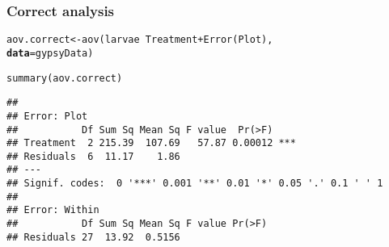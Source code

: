 \documentclass[color=usenames,dvipsnames]{beamer}\usepackage[]{graphicx}\usepackage[]{color}
\makeatletter
\newcommand{\hlopt}[1]{\textcolor[rgb]{0,0,0}{#1}}%
\newcommand{\hlstd}[1]{\textcolor[rgb]{0,0,0}{#1}}%
\newcommand{\hlkwb}[1]{\textcolor[rgb]{0,0.341,0.682}{#1}}%
\newcommand{\hlkwc}[1]{\textcolor[rgb]{0,0,0}{\textbf{#1}}}%
\newcommand{\hlkwd}[1]{\textcolor[rgb]{0.004,0.004,0.506}{#1}}%
\newenvironment{kframe}{%
 \def\at@end@of@kframe{}%
 \ifinner\ifhmode%
  \def\at@end@of@kframe{\end{minipage}}%
  \begin{minipage}{\columnwidth}%
 \fi\fi%
 \def\FrameCommand##1{\hskip\@totalleftmargin \hskip-\fboxsep
 \colorbox{shadecolor}{##1}\hskip-\fboxsep
     \hskip-\linewidth \hskip-\@totalleftmargin \hskip\columnwidth}%
 \MakeFramed {\advance\hsize-\width
   \@totalleftmargin\z@ \linewidth\hsize
   \@setminipage}}%
 {\par\unskip\endMakeFramed%
 \at@end@of@kframe}
\newenvironment{knitrout}{}{} %
\makeatother
\begin{document}
\begin{frame}[fragile]
  \frametitle{Correct analysis}
\begin{knitrout}\small
{}\color{fgcolor}\begin{kframe}
\begin{alltt}
\hlstd{aov.correct} \hlkwb{<-} \hlkwd{aov}\hlstd{(larvae} \hlopt{~} \hlstd{Treatment} \hlopt{+} \hlkwd{Error}\hlstd{(Plot),}
                   \hlkwc{data}\hlstd{=gypsyData)}
\end{alltt}
\end{kframe}
\end{knitrout}
\pause
\begin{knitrout}\small
{}\color{fgcolor}\begin{kframe}
\begin{alltt}
\hlkwd{summary}\hlstd{(aov.correct)}
\end{alltt}
\begin{verbatim}
## 
## Error: Plot
##           Df Sum Sq Mean Sq F value  Pr(>F)    
## Treatment  2 215.39  107.69   57.87 0.00012 ***
## Residuals  6  11.17    1.86                    
## ---
## Signif. codes:  0 '***' 0.001 '**' 0.01 '*' 0.05 '.' 0.1 ' ' 1
## 
## Error: Within
##           Df Sum Sq Mean Sq F value Pr(>F)
## Residuals 27  13.92  0.5156
\end{verbatim}
\end{kframe}
\end{knitrout}
\end{frame}
\end{document}
